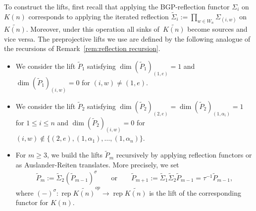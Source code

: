 \documentclass{amsart}
\numberwithin{equation}{section}
\newcommand{\rep}{\operatorname{rep}}
\begin{document}
To construct the lifts, first recall that applying the BGP-reflection functor $\Sigma_i$ on $K(n)$ corresponds to applying the iterated reflection $\tilde\Sigma_i:=\prod_{w\in W_n}\Sigma_{(i,w)}$ on $\widetilde{K(n)}$.
Moreover, under this operation all sinks of~$\widetilde{K(n)}$ become sources and vice versa.
The preprojective lifts we use are defined by the following analogue of the recursions of Remark~\ref{rem:reflection recursion}.
\begin{itemize}
  \item We consider the lift $\tilde P_1$ satisfying $\dim(\tilde P_1)_{(1,e)}=1$ and $\dim (\tilde P_1)_{(i,w)}=0$ for $(i,w)\neq (1,e)$.
  \item We consider the lift $\tilde P_2$ satisfying $\dim (\tilde P_2)_{(2,e)}=\dim (\tilde P_2)_{(1,\alpha_i)}=1$ for $1\le i\le n$ and $\dim(\tilde P_2)_{(i,w)}=0$ for $(i,w)\notin\{(2,e),(1,\alpha_1),\ldots,(1,\alpha_n)\}$.
  \item For $m\geq 3$, we build the lifts $\tilde P_m$ recursively by applying reflection functors or as Auslander-Reiten translates.
    More precisely, we set
    \begin{align}
      \label{eq:recursive covers}
      \tilde P_m:=\tilde\Sigma_2(\tilde P_{m-1})^{\sigma}\qquad\text{or}\qquad\tilde P_{m+1}:=\tilde\Sigma_{1}\tilde\Sigma_2\tilde P_{m-1}=\tau^{-1} \tilde P_{m-1},
    \end{align}
    where $(-)^\sigma:\rep\widetilde{K(n)}^{op}\to\rep\widetilde{K(n)}$ is the lift of the corresponding functor for $K(n)$.
\end{itemize}
\end{document}

